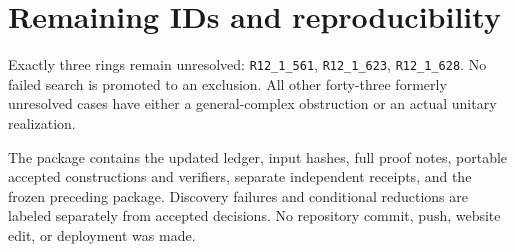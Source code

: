 \documentclass[11pt]{article}
\newcommand{\R}[1]{\texttt{R12\_1\_#1}}
\begin{document}
\section{Remaining IDs and reproducibility}
Exactly three rings remain unresolved: \R{561}, \R{623}, \R{628}.
No failed search is promoted to an exclusion. All other forty-three
formerly unresolved cases have either a general-complex obstruction or
an actual unitary realization.

The package contains the updated ledger, input hashes, full proof notes,
portable accepted constructions and verifiers, separate independent
receipts, and the frozen preceding package. Discovery failures and
conditional reductions are labeled separately from accepted decisions.
No repository commit, push, website edit, or deployment was made.
\end{document}
